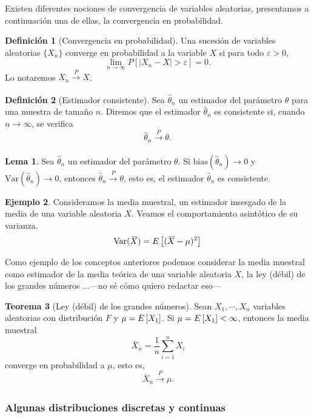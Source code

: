 \documentclass[10pt,a4paper]{article} %
\let\mathbb\relax
\newcommand{\bias}{\text{bias}}
\newcommand{\Var}{\text{Var}}
\newcommand{\olsi}[1]{\,\overline{\!{#1}}} %
\theoremstyle{definition}
\newtheorem{definition}{Definición}[section]
\newtheorem{theorem}{Teorema}[section]
\newtheorem{lemma}[theorem]{Lema}
\newtheorem{example}[theorem]{Ejemplo}
\begin{document}
Existen diferentes nociones de convergencia de variables aleatorias, presentamos a continuación una de ellas, la convergencia en probabilidad.
\begin{definition}[Convergencia en probabilidad]
  Una sucesión de variables aleatorias $\{X_n\}$ converge en probabilidad a la variable $X$ si para todo $\varepsilon > 0$,\[
\lim_{n\to\infty}P\left[|X_n-X|>\varepsilon \right] = 0. 
  \] Lo notaremos $X_n\xrightarrow[]{P}X$.
\end{definition}


\begin{definition}[Estimador consistente]
  Sea $\hat{\theta}_n$ un estimador del parámetro $\theta$ para una muestra de tamaño $n$. Diremos que el estimador $\hat{\theta}_n$ es consistente si, cuando $n\to\infty$, se verifica\[
\hat{\theta}_n\xrightarrow[]{P}\theta.
  \]
\end{definition}

\begin{lemma}
  Sea $\hat{\theta}_n$ un estimador del parámetro $\theta$. Si $\bias\left(\hat{\theta}_n\right)\to 0$ y $\Var\left(\hat{\theta}_n\right)\to0$, entonces $\hat{\theta}_n\xrightarrow[]{P}\theta$, esto es, el estimador $\hat{\theta}_n$ es consistente.
\end{lemma}

\begin{example}
  Consideramos la media muestral, un estimador insesgado de la media de una variable aleatoria $X$. Veamos el comportamiento asintótico de su varianza.\[
\Var(\olsi{X}) = \E\left[(\olsi{X}-\mu)^2\right]
  \]
\end{example}

Como ejemplo de los conceptos anteriores podemos considerar la media muestral como estimador de la media teórica de una variable aleatoria $X$, la ley (débil) de los grandes números ...---no sé cómo quiero redactar eso---

\begin{theorem}[Ley (débil) de los grandes números]\label{t:lgn}
  Sean $X_1,\cdots,X_n$ variables aleatorias con distribución $F$ y $\mu =\mathbb{E}\left [X_1 \right]$. Si $\mu =\mathbb{E}\left [X_1 \right] < \infty$, entonces la media muestral\[
\olsi{X}_n = \frac{1}{n}\sum_{i=1}^nX_i
\]converge en probabilidad a $\mu$, esto es,\[
\olsi{X}_n\xrightarrow[]{P} \mu.
\]
  
\end{theorem}


\subsubsection{Algunas distribuciones discretas y continuas}
\end{document}
